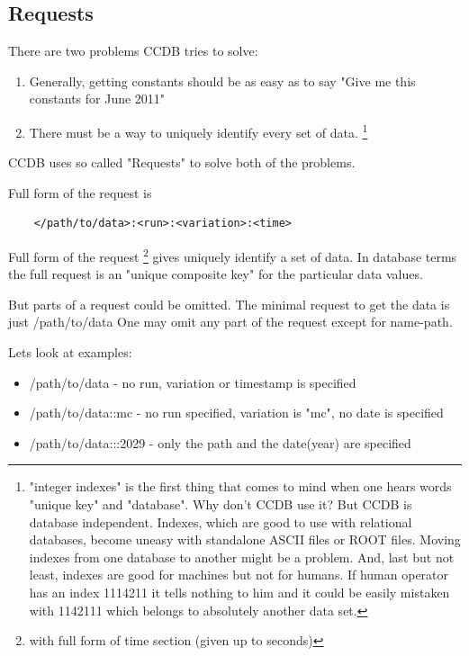 \documentclass{article}
\begin{document}
%
\subsection{Requests}
There are two problems CCDB tries to solve:
\begin{enumerate}
  \item Generally, getting constants should be as easy as to say
        "Give me this constants for June 2011"

  \item There must be a way to uniquely identify every set of data.
  \footnote{
    "integer indexes" is the first thing that comes to mind 
    when one hears words "unique key" and "database". Why don't CCDB use it?
    But CCDB is database independent. Indexes, which are good to use with
    relational databases, become uneasy with standalone ASCII
    files or ROOT files. Moving indexes from one database to another might be a
    problem. And, last but not least, indexes are good for machines but not for humans. If human operator has an index 1114211 it tells nothing to him and it could be easily mistaken with 1142111 which belongs to absolutely another data set.
  }
\end{enumerate}
\vspace{1 em}

CCDB uses so called "Requests" to solve both of the problems. 

Full form of the request is
\begin{verbatim}
    </path/to/data>:<run>:<variation>:<time>
\end{verbatim}
\vspace{1 em}

Full form of the request \footnote{with full form of time section (given up to seconds)} gives uniquely identify a set of data. In database terms the full request is an "unique composite key" for the particular data values.

But parts of a request could be omitted. 
The minimal request to get the data is just /path/to/data
One may omit any part of the request except for name-path.

Lets look at examples:
\begin{itemize}
\item /path/to/data - no run, variation or timestamp is specified
\item /path/to/data::mc - no run specified, variation is "mc", no date is specified
\item /path/to/data:::2029 - only the path and the date(year) are specified
\end{itemize}
\end{document}
